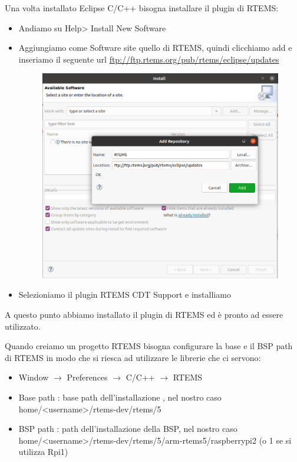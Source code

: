 \documentclass[12pt, a4paper]{article}
\begin{document}
\begin{flushleft}
Una volta installato Eclipse C/C++ bisogna installare il plugin di RTEMS:
\begin{itemize}
\item Andiamo su Help> Install New Software
\item Aggiungiamo come Software site quello di RTEMS, quindi clicchiamo add e inseriamo il seguente url \url{ftp://ftp.rtems.org/pub/rtems/eclipse/updates}
\begin{figure}[h!]
\includegraphics[width=\linewidth]{ftp-rtems-eclipse.png}
\end{figure}
\item Selezioniamo il plugin RTEMS CDT Support e installiamo
\end{itemize}

A questo punto abbiamo installato il plugin di RTEMS ed è pronto ad essere utilizzato.

\newpage

Quando creiamo un progetto RTEMS bisogna configurare la base e il BSP path di RTEMS in modo che si riesca ad utilizzare le librerie che ci servono:
\begin{itemize}
\item Window $\rightarrow$ Preferences $\rightarrow$ C/C++ $\rightarrow$ RTEMS
\item Base path : base path dell'installazione , nel nostro caso home/<username>/rtems-dev/rtems/5
\item BSP path : path dell'installazione della BSP, nel nostro caso home/<username>/rtems-dev/rtems/5/arm-rtems5/raspberrypi2 (o 1 se si utilizza Rpi1)
\end{itemize}


\end{flushleft}
\end{document}
